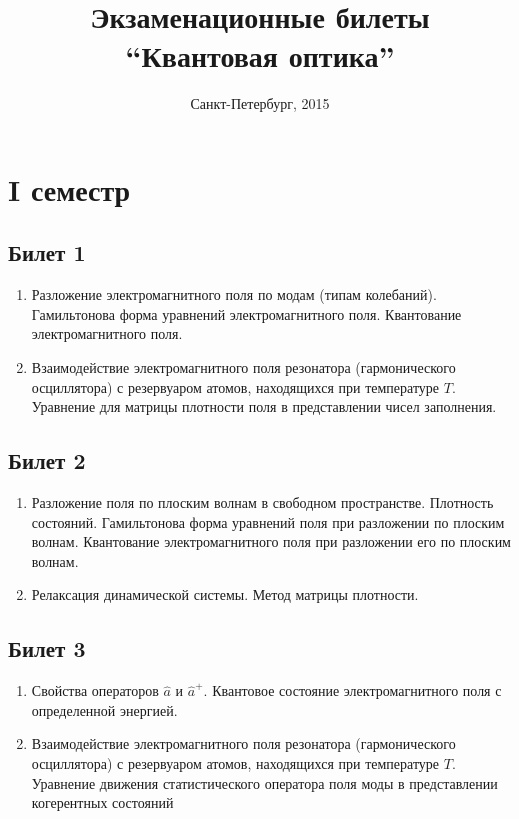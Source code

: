 \documentclass[12pt,a4paper]{article}
\begin{document}
\Russian

\title{Экзаменационные билеты \\ ``Квантовая оптика''}
\author{}
\date{Санкт-Петербург, 2015}
\maketitle
\newpage


\section*{I семестр}

\subsection*{Билет 1} 
\begin{enumerate}
\item Разложение электромагнитного поля по модам (типам колебаний).
Гамильтонова форма уравнений электромагнитного поля. Квантование
электромагнитного поля. 
\item Взаимодействие электромагнитного поля резонатора
  (гармонического осциллятора) с резервуаром атомов, находящихся при
  температуре $T$. Уравнение для матрицы плотности поля в представлении чисел
  заполнения.
\end{enumerate}

\subsection*{Билет 2} 
\begin{enumerate}
\item Разложение поля по плоским волнам в свободном пространстве. 
Плотность состояний. Гамильтонова форма уравнений поля при разложении по плоским
волнам. Квантование электромагнитного поля при разложении его по
плоским волнам.
\item Релаксация динамической системы. Метод матрицы плотности. 
\end{enumerate}

\subsection*{Билет 3} 
\begin{enumerate}
\item Свойства операторов $ \hat a $ и $ \hat a ^+ $. Квантовое
состояние электромагнитного поля  с определенной энергией. 
\item Взаимодействие электромагнитного поля резонатора
  (гармонического осциллятора) с резервуаром атомов, находящихся при
  температуре $T$. Уравнение движения статистического оператора поля моды в
  представлении когерентных состояний
\end{enumerate}
\end{document}
